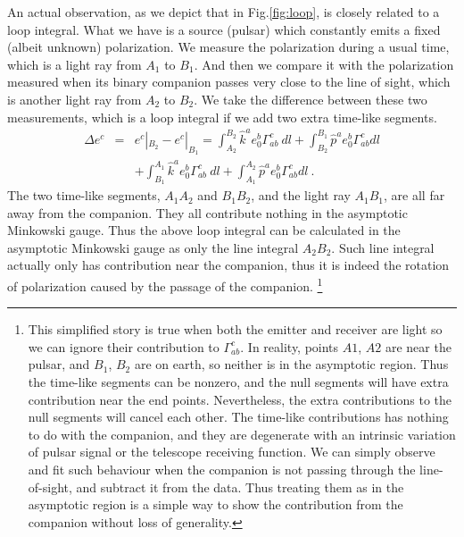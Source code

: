 \documentclass[aps,showpacs,twocolumn,floats,prd,superscriptaddress,nofootinbib]{revtex4-1}
\begin{document}
An actual observation, as we depict that in Fig.\ref{fig:loop}, is closely related to a loop integral.
What we have is a source (pulsar) which constantly emits a fixed (albeit unknown) polarization. 
We measure the polarization during a usual time, which is a light ray from $A_1$ to $B_1$. 
And then we compare it with the polarization measured when its binary companion passes very close to the line of sight, which is another light ray from $A_2$ to $B_2$. 
We take the difference between these two measurements, which is a loop integral if we add two extra time-like segments.
\begin{eqnarray}
\Delta e^c &=& e^c|_{ B_2} - e^c|_{ B_1}
= \int_{A_2}^{B_2} \hat{k}^a e_0^b \Gamma_{ab}^c~dl
 + \int_{B_2}^{B_1} \hat{p}^a e_0^b \Gamma_{ab}^c dl  \nonumber \\ 
&&+ \int_{B_1}^{A_1} \hat{k}^a e_0^b \Gamma_{ab}^c~dl +
\int_{A_1}^{A_2} \hat{p}^a e_0^b \Gamma_{ab}^c dl~.
\label{eq-pulsar}
\end{eqnarray}
The two time-like segments, $A_1A_2$ and $B_1B_2$,  and the light ray $A_1B_1$, are all far away from the companion.
They all contribute nothing in the asymptotic Minkowski gauge.
Thus the above loop integral can be calculated in the asymptotic Minkowski gauge as only the line integral $A_2B_2$.
Such line integral actually only has contribution near the companion, thus it is indeed the rotation of polarization caused by the passage of the companion.
\footnote{
This simplified story is true when both the emitter and receiver are light so we can ignore their contribution to $\Gamma_{ab}^c$.
In reality, points $A1$, $A2$ are near the pulsar, and $B_1$, $B_2$ are on earth, so neither is in the asymptotic region.
Thus the time-like segments can be nonzero, and the null segments will have extra contribution near the end points.
Nevertheless, the extra contributions to the null segments will cancel each other.
The time-like contributions has nothing to do with the companion, and they are degenerate with an intrinsic variation of pulsar signal or the telescope receiving function.
We can simply observe and fit such behaviour when the companion is not passing through the line-of-sight, and subtract it from the data.
Thus treating them as in the asymptotic region is a simple way to show the contribution from the companion without loss of generality.}
\end{document}
